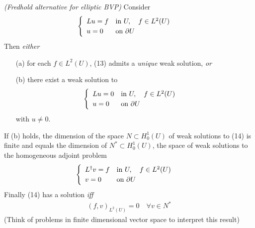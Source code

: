 \documentclass[12pt,a4paper]{report}
\begin{document}
\thm \emph{(Fredhold alternative for elliptic BVP)} Consider
\begin{align}
\begin{cases}
\begin{array}{ll}
Lu = f & \text{in } U, \quad f\in L^2(U) \\
u = 0 & \text{on } \partial U
\end{array}
\end{cases} \label{14}
\end{align}
Then \emph{either} \begin{itemize}
\item[(a)] for each $f\in L^2(U)$, (13) admits a \emph{unique} weak solution, \emph{or}
\item[(b)] there exist a weak solution to
\begin{align}
\begin{cases}
\begin{array}{ll}
Lu = 0 & \text{in } U, \quad f\in L^2(U) \\
u = 0 & \text{on } \partial U
\end{array}
\end{cases} \label{15}
\end{align}
with $u \neq 0$.
\end{itemize}
If (b) holds, the dimension of the space $N \subset H_0^1(U)$ of weak solutions to (14) is finite and equals the dimension of $N^* \subset H_0^1(U)$, the space of weak solutions to the homogeneous adjoint problem
\begin{align*}
\begin{cases}
\begin{array}{ll}
L^{\dagger}v = f & \text{in } U, \quad f\in L^2(U) \\
v = 0 & \text{on } \partial U
\end{array}
\end{cases}
\end{align*}
\quad Finally (14) has a solution \emph{iff}
\begin{align*}
(f,v)_{L^2(U)} = 0 \quad \forall v\in N^*
\end{align*}
(Think of problems in finite dimensional vector space to interpret this result)
\end{document}
